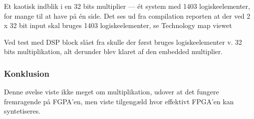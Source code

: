 {Et kaotisk indblik i en 32 bits multiplier --- ét system med 1403 logiskeelementer, for mange til at have på én side.}
Det ses ud fra compilation reporten at der ved 2 x 32 bit input skal bruges 1403 logiskeelementer, se Technology map viewet 

Ved test med DSP block slået fra skulle der først bruges logiskeelementer v. 32 bits multiplikation, alt derunder blev klaret af den embedded multiplier.

\subsubsection{Konklusion}
Denne øvelse viste ikke meget om multiplikation, udover at det fungere fremragende på FGPA'en, men viste tilgengæld hvor effektivt FPGA'en kan syntetiseres.